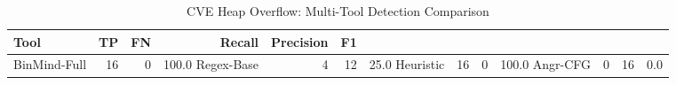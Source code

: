 \begin{table}[htbp]
\centering
\caption{CVE Heap Overflow: Multi-Tool Detection Comparison}
\label{tab:cve-multi-tool}
\begin{tabular}{lrrrrr}
\toprule
Tool & TP & FN & Recall & Precision & F1 \\
\midrule
BinMind-Full & 16 & 0 & 100.0%
Regex-Base & 4 & 12 & 25.0%
Heuristic & 16 & 0 & 100.0%
Angr-CFG & 0 & 16 & 0.0%
\bottomrule
\end{tabular}
\end{table}
